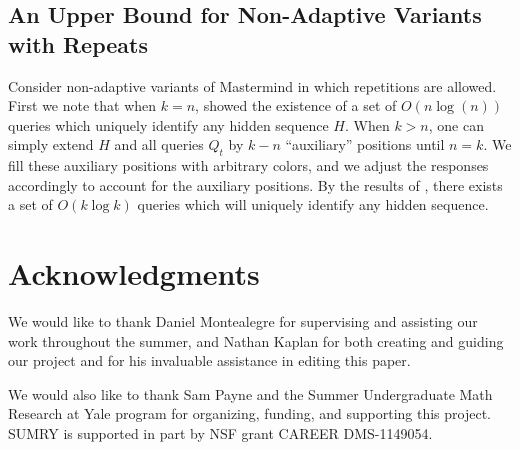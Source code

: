 \documentclass[12pt, a4paper]{article}
\begin{document}
\subsection{An Upper Bound for Non-Adaptive Variants with Repeats}
Consider non-adaptive variants of Mastermind in which repetitions are allowed. First we note that when $k=n$, \cite{DS13} showed the existence of a set of $O(n \log(n))$ queries which uniquely identify any hidden sequence $H$. When $k > n$, one can simply extend $H$ and all queries $Q_t$ by $k - n$ ``auxiliary'' positions until $n = k$. We fill these auxiliary positions with arbitrary colors, and we adjust the responses accordingly to account for the auxiliary positions. By the results of \cite{DS13}, there exists a set of $O(k \log k)$ queries which will uniquely identify any hidden sequence.

\section{Acknowledgments}
We would like to thank Daniel Montealegre for supervising and assisting our work throughout the summer, and Nathan Kaplan for both creating and guiding our project and for his invaluable assistance in editing this paper. 

 We would also like to thank Sam Payne and the Summer Undergraduate Math Research at Yale program for organizing, funding, and supporting this project. SUMRY is supported in part by NSF grant CAREER DMS-1149054.
\clearpage


\end{document}
